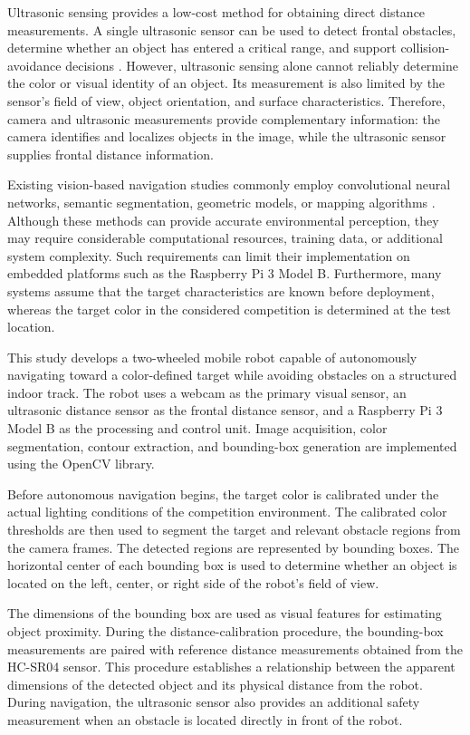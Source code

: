 Ultrasonic sensing provides a low-cost method for obtaining direct distance measurements. A single ultrasonic sensor can be used to detect frontal obstacles, determine whether an object has entered a critical range, and support collision-avoidance decisions \cite{yasin2021ultrasonic}. However, ultrasonic sensing alone cannot reliably determine the color or visual identity of an object. Its measurement is also limited by the sensor's field of view, object orientation, and surface characteristics. Therefore, camera and ultrasonic measurements provide complementary information: the camera identifies and localizes objects in the image, while the ultrasonic sensor supplies frontal distance information.

Existing vision-based navigation studies commonly employ convolutional neural networks, semantic segmentation, geometric models, or mapping algorithms \cite{wang2021monocular,dang2023obstacle}. Although these methods can provide accurate environmental perception, they may require considerable computational resources, training data, or additional system complexity. Such requirements can limit their implementation on embedded platforms such as the Raspberry Pi 3 Model B. Furthermore, many systems assume that the target characteristics are known before deployment, whereas the target color in the considered competition is determined at the test location.

This study develops a two-wheeled mobile robot capable of autonomously navigating toward a color-defined target while avoiding obstacles on a structured indoor track. The robot uses a webcam as the primary visual sensor, an ultrasonic distance sensor as the frontal distance sensor, and a Raspberry Pi 3 Model B as the processing and control unit. Image acquisition, color segmentation, contour extraction, and bounding-box generation are implemented using the OpenCV library.

Before autonomous navigation begins, the target color is calibrated under the actual lighting conditions of the competition environment. The calibrated color thresholds are then used to segment the target and relevant obstacle regions from the camera frames. The detected regions are represented by bounding boxes. The horizontal center of each bounding box is used to determine whether an object is located on the left, center, or right side of the robot's field of view.

The dimensions of the bounding box are used as visual features for estimating object proximity. During the distance-calibration procedure, the bounding-box measurements are paired with reference distance measurements obtained from the HC-SR04 sensor. This procedure establishes a relationship between the apparent dimensions of the detected object and its physical distance from the robot. During navigation, the ultrasonic sensor also provides an additional safety measurement when an obstacle is located directly in front of the robot.

